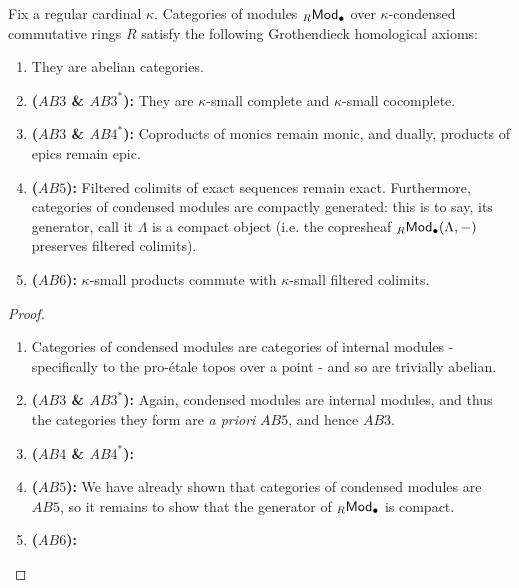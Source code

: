             \begin{theorem} \label{theorem: abelian_categories_of_condensed_modules}
                Fix a regular cardinal $\kappa$. Categories of modules ${}_R\mathsf{Mod}_{\bullet}$ over $\kappa$-condensed commutative rings $R$ satisfy the following Grothendieck homological axioms:
                    \begin{enumerate}
                        \item They are abelian categories.
                        \item \textbf{($AB3$ \& $AB3^*$):} They are $\kappa$-small complete and $\kappa$-small cocomplete.
                        \item \textbf{($AB3$ \& $AB4^*$):} Coproducts of monics remain monic, and dually, products of epics remain epic.
                        \item \textbf{($AB5$):} Filtered colimits of exact sequences remain exact. Furthermore, categories of condensed modules are compactly generated: this is to say, its generator, call it $\Lambda$ is a compact object (i.e. the copresheaf ${}_R\mathsf{Mod}_{\bullet}(\Lambda, -)$ preserves filtered colimits).
                        \item \textbf{($AB6$):} $\kappa$-small products commute with $\kappa$-small filtered colimits.
                    \end{enumerate}
            \end{theorem}
                \begin{proof}
                    \noindent
                    \begin{enumerate}
                        \item Categories of condensed modules are categories of internal modules - specifically to the pro-\'etale topos over a point - and so are trivially abelian. 
                        \item \textbf{($AB3$ \& $AB3^*$):} Again, condensed modules are internal modules, and thus the categories they form are \textit{a priori} $AB5$, and hence $AB3$.
                        \item \textbf{($AB4$ \& $AB4^*$):} 
                        \item \textbf{($AB5$):} We have already shown that categories of condensed modules are $AB5$, so it remains to show that the generator of ${}_R\mathsf{Mod}_{\bullet}$ is compact.
                        \item \textbf{($AB6$):} 
                    \end{enumerate}
                \end{proof}
